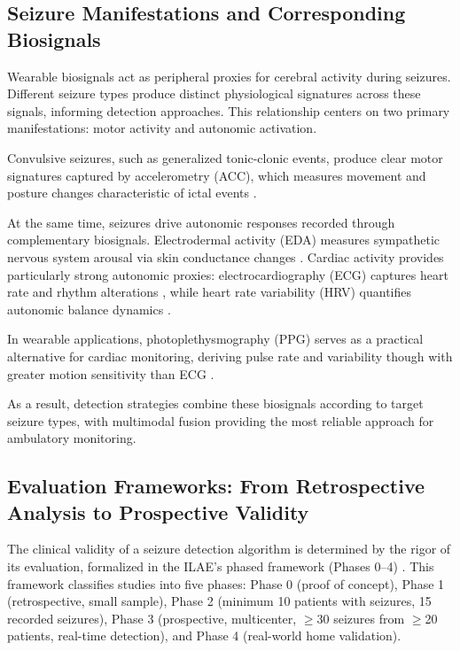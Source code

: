 \subsection{Seizure Manifestations and Corresponding Biosignals}

Wearable biosignals act as peripheral proxies for cerebral activity during seizures. 
Different seizure types produce distinct physiological signatures across these signals, 
informing detection approaches. This relationship centers on two primary manifestations: 
motor activity and autonomic activation.

Convulsive seizures, such as generalized tonic-clonic events, 
produce clear motor signatures captured by accelerometry (ACC), 
which measures movement and posture changes characteristic of ictal events 
\parencite{wangEpilepticSeizureDetection2025, wuNovelSeizureDetection2024}.

At the same time, seizures drive autonomic responses recorded through complementary biosignals. 
Electrodermal activity (EDA) measures sympathetic nervous system arousal via skin conductance changes 
\parencite{jainCompressedSensingBased2017, mironAutonomicBiosignalsSeizure2025}. 
Cardiac activity provides particularly strong autonomic proxies: electrocardiography (ECG) 
captures heart rate and rhythm alterations 
\parencite{lealViabilityECGFeatures2017, ghaderiAdvancesMachineLearning2025}, 
while heart rate variability (HRV) quantifies autonomic balance dynamics 
\parencite{masonHeartRateVariability2024, paveiEarlySeizureDetection2017}.

In wearable applications, photoplethysmography (PPG) serves 
as a practical alternative for cardiac monitoring,
deriving pulse rate and variability though with greater motion sensitivity than ECG 
\parencite{chenSeizuresDetectionUsing2022, sethFeasibilityCardiacbasedSeizure2023}.

As a result, detection strategies combine these biosignals according to target seizure types, 
with multimodal fusion providing the most reliable approach for ambulatory monitoring.

\subsection{Evaluation Frameworks: From Retrospective Analysis to Prospective Validity}
\label{sec:ilae-standards}

The clinical validity of a seizure detection algorithm is determined by the rigor of
its evaluation, formalized in the ILAE's phased framework (Phases 0--4)
\parencite{beniczkyStandardsTestingClinical2018, beniczkyAutomatedSeizureDetection2021}.
This framework classifies studies into five phases: Phase 0 (proof of concept), Phase 1 (retrospective, small sample), Phase 2 (minimum 10 patients with seizures, 15 recorded seizures), Phase 3 (prospective, multicenter, $\ge$30 seizures from $\ge$20 patients, real-time detection), and Phase 4 (real-world home validation).

